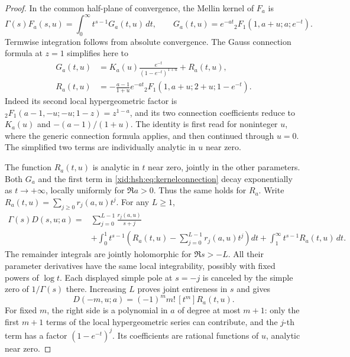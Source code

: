 \documentclass[11pt,a4paper]{article}
\numberwithin{equation}{section}
\theoremstyle{definition}
\theoremstyle{remark}
\begin{document}
\begin{proof}
In the common half-plane of convergence, the Mellin kernel of $F_a$ is
\begin{equation}\label{xid:hsh:eq:Mellin}
 \Gamma(s)F_a(s,u)=\int_0^{\infty}t^{s-1}G_a(t,u)\,dt,
 \qquad G_a(t,u)=e^{-at}
          {}_2F_1(1,a+u;a;e^{-t}).
\end{equation}
Termwise integration follows from absolute convergence. The Gauss
connection formula at $z=1$ \cite{hsh:DLMFGauss} simplifies here to
\begin{equation}\label{xid:hsh:eq:kernelconnection}
 \begin{split}
 G_a(t,u)&=K_a(u)\frac{e^{-t}}{(1-e^{-t})^{1+u}}+R_a(t,u),\\
 R_a(t,u)&=-\frac{a-1}{1+u}e^{-at}
       {}_2F_1(1,a+u;2+u;1-e^{-t}).
 \end{split}
\end{equation}
Indeed its second local hypergeometric factor is
${}_2F_1(a-1,-u;-u;1-z)=z^{1-a}$, and its two connection
coefficients reduce to $K_a(u)$ and $-(a-1)/(1+u)$.
The identity is first read for noninteger $u$, where the generic
connection formula applies, and then continued through $u=0$.
The simplified two terms are individually analytic in $u$ near zero.

The function $R_a(t,u)$ is analytic in $t$ near zero, jointly in the
other parameters. Both $G_a$ and the first term in
\eqref{xid:hsh:eq:kernelconnection} decay exponentially as $t\to+\infty$,
locally uniformly for $\Re a>0$. Thus the same holds for $R_a$.
Write $R_a(t,u)=\sum_{j\ge0}r_j(a,u)t^j$. For any $L\ge1$,
\[
 \begin{split}
 \Gamma(s)D(s,u;a)={}&\sum_{j=0}^{L-1}\frac{r_j(a,u)}{s+j}\\
 &+\int_0^1t^{s-1}\left(R_a(t,u)-\sum_{j=0}^{L-1}r_j(a,u)t^j\right)dt
  +\int_1^{\infty}t^{s-1}R_a(t,u)\,dt.
 \end{split}
\]
The remainder integrals are jointly holomorphic for $\Re s>-L$.
All their parameter derivatives have the same local integrability,
possibly with fixed powers of $\log t$. Each displayed simple pole
at $s=-j$ is canceled by the simple zero of $1/\Gamma(s)$ there.
Increasing $L$ proves joint entireness in $s$ and gives
\begin{equation}\label{xid:hsh:eq:Dlocal}
 D(-m,u;a)=(-1)^m m!\,[t^m]R_a(t,u).
\end{equation}
For fixed $m$, the right side is a polynomial in $a$ of degree at most
$m+1$: only the first $m+1$ terms of the local hypergeometric series
can contribute, and the $j$-th term has a factor $(1-e^{-t})^j$.
Its coefficients are rational functions of $u$, analytic near zero.


\end{proof}
\end{document}
